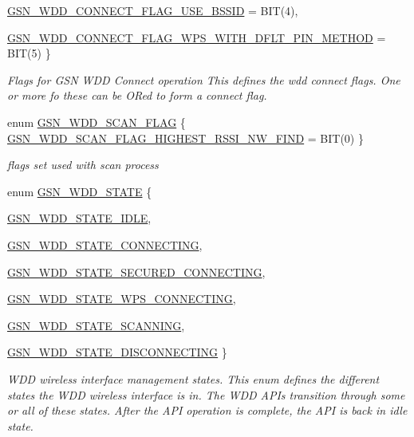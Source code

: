 \begin{DoxyCompactItemize}
\hyperlink{a00677_gga2846a7c5251eb6332e71299cef92d003a98743e2fc7097d6818d140bfc051a921}{GSN\_\-WDD\_\-CONNECT\_\-FLAG\_\-USE\_\-BSSID} =  BIT(4), 
\par
\hyperlink{a00677_gga2846a7c5251eb6332e71299cef92d003abc8bea2329e8acac4ddcd3ea910c7203}{GSN\_\-WDD\_\-CONNECT\_\-FLAG\_\-WPS\_\-WITH\_\-DFLT\_\-PIN\_\-METHOD} =  BIT(5)
 \}
\begin{DoxyCompactList}\small\item\em Flags for GSN WDD Connect operation This defines the wdd connect flags. One or more fo these can be ORed to form a connect flag. \end{DoxyCompactList}\item 
enum \hyperlink{a00677_gaa5a68f88cc724016ff0334f21c0dd120}{GSN\_\-WDD\_\-SCAN\_\-FLAG} \{ \hyperlink{a00677_ggaa5a68f88cc724016ff0334f21c0dd120af8eb784f34297ba01c491b4b8e8ac4a4}{GSN\_\-WDD\_\-SCAN\_\-FLAG\_\-HIGHEST\_\-RSSI\_\-NW\_\-FIND} =  BIT(0)
 \}
\begin{DoxyCompactList}\small\item\em flags set used with scan process \end{DoxyCompactList}\item 
enum \hyperlink{a00677_ga235b17af49bd1a1dc55715a7809b24ff}{GSN\_\-WDD\_\-STATE} \{ \par
\hyperlink{a00677_gga235b17af49bd1a1dc55715a7809b24ffa85f6148682bde7eb370b55ad17044c93}{GSN\_\-WDD\_\-STATE\_\-IDLE}, 
\par
\hyperlink{a00677_gga235b17af49bd1a1dc55715a7809b24ffab9dfd40ad92dc407336914a170a14a5d}{GSN\_\-WDD\_\-STATE\_\-CONNECTING}, 
\par
\hyperlink{a00677_gga235b17af49bd1a1dc55715a7809b24ffa6c3a9720a310ff028b93050b034c3f6e}{GSN\_\-WDD\_\-STATE\_\-SECURED\_\-CONNECTING}, 
\par
\hyperlink{a00677_gga235b17af49bd1a1dc55715a7809b24ffa45ab3a36a018ce282732ef888382a6ed}{GSN\_\-WDD\_\-STATE\_\-WPS\_\-CONNECTING}, 
\par
\hyperlink{a00677_gga235b17af49bd1a1dc55715a7809b24ffa809d7f6973224af7492c48f3c4b7ca4c}{GSN\_\-WDD\_\-STATE\_\-SCANNING}, 
\par
\hyperlink{a00677_gga235b17af49bd1a1dc55715a7809b24ffa41f6dfce18e1ef088d7d7bd24c250f97}{GSN\_\-WDD\_\-STATE\_\-DISCONNECTING}
 \}
\begin{DoxyCompactList}\small\item\em WDD wireless interface management states. This enum defines the different states the WDD wireless interface is in. The WDD APIs transition through some or all of these states. After the API operation is complete, the API is back in idle state. \end{DoxyCompactList}\end{DoxyCompactItemize}
